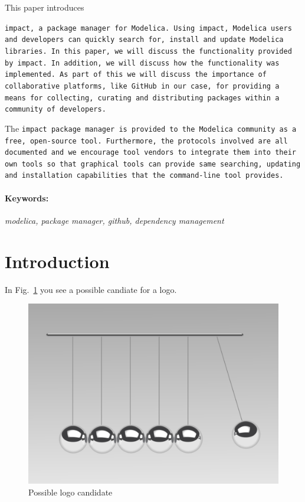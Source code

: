 \documentclass[11pt,a4paper,twocolumn]{article}
\begin{document}
This paper introduces \em{\tt{impact}, a package manager for Modelica.
  Using \tt{impact}, Modelica users and developers can quickly search
  for, install and update Modelica libraries.  In this paper, we will
  discuss the functionality provided by \tt{impact}.  In addition, we
  will discuss how the functionality was implemented.  As part of this
  we will discuss the importance of collaborative platforms, like
  \tt{GitHub} in our case, for providing a means for collecting,
  curating and distributing packages within a community of developers.

The \tt{impact} package manager is provided to the Modelica community
as a free, open-source tool.  Furthermore, the protocols involved are
all documented and we encourage tool vendors to integrate them into
their own tools so that graphical tools can provide same searching,
updating and installation capabilities that the command-line tool
provides.

\paragraph{Keywords:}\emph{modelica, package manager, github, dependency management}

\section{Introduction}
\label{sec:intro}
In Fig.~\ref{fig:newtons_cradle} you see a possible candiate for a logo.


\begin{figure}[!ht]
  \centering
  \includegraphics[width=\columnwidth]{newtons_cradle}
  \caption{Possible logo candidate \cite{Andersson2007}}
  \label{fig:newtons_cradle}
\end{figure}


}
\end{document}
